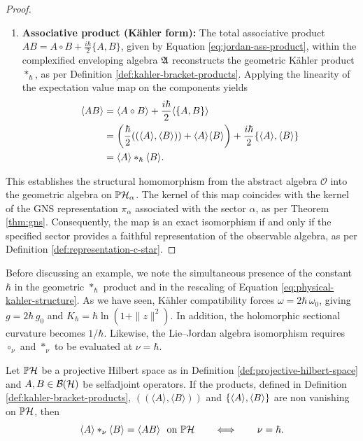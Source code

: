 \begin{proof}
\begin{enumerate}
		\item \textbf{Associative product (Kähler form):}
		The total associative product $AB = A \circ B + \frac{i\hbar}{2}\{A,B\}$, given by Equation \eqref{eq:jordan-ass-product}, within the complexified enveloping algebra $\mathfrak{A}$ reconstructs the geometric Kähler product $*_{\hbar}$, as per Definition \ref{def:kahler-bracket-products}. Applying the linearity of the expectation value map on the components yields
		\begin{align}
			\langle AB \rangle &= \langle A \circ B \rangle + \frac{i\hbar}{2}\langle \{A,B\} \rangle \nonumber \\
			&= \left( \frac{\hbar}{2}((\langle A \rangle, \langle B \rangle)) + \langle A \rangle \langle B \rangle \right) + \frac{i\hbar}{2}\{\langle A\rangle,\langle B\rangle\} \nonumber \\
			&= \langle A \rangle *_{\hbar} \langle B \rangle.
		\end{align} 
	\end{enumerate}
	This establishes the structural homomorphism from the abstract algebra $\mathcal{O}$ into the geometric algebra on $\PH_\alpha$. The kernel of this map coincides with the kernel of the GNS representation $\pi_\alpha$ associated with the sector $\alpha$, as per Theorem \ref{thm:gns}. Consequently, the map is an exact isomorphism if and only if the specified sector provides a faithful representation of the observable algebra, as per Definition \ref{def:representation-c-star}. 
\end{proof}

Before discussing an example, we note the simultaneous presence of the constant $\hbar$ in the geometric $*_{\hbar}$ product and in the rescaling of Equation \eqref{eq:physical-kahler-structure}. As we have seen, Kähler compatibility forces \(\omega = 2\hbar\,\omega_0\), giving \(g = 2\hbar\,g_0\) and \(K_{\hbar}=\hbar \ln(1+\|z\|^2)\). In addition, the holomorphic sectional curvature becomes \(1/\hbar\). Likewise, the Lie--Jordan algebra isomorphism requires \(\circ_{\nu}\) and \(*_{\nu}\) to be evaluated at \(\nu=\hbar\).

\begin{corollary}[Imposition of $\nu = \hbar$]
	\label{cor:hbar-structural-necessity}
	Let $\PH$ be a projective Hilbert space as in Definition \ref{def:projective-hilbert-space} and $A,B\in\BH$ be selfadjoint operators. If the products, defined in Definition \ref{def:kahler-bracket-products}, $((\langle A\rangle ,\langle B\rangle ))$ and
	$\{\langle A\rangle ,\langle B\rangle \}$ are non vanishing on $\PH$, then
	\begin{equation}
		\langle A\rangle *_{\nu} \langle B\rangle = \langle AB\rangle \ \text{ on } \PH
		\qquad\Longleftrightarrow\qquad \nu=\hbar.
	\end{equation}
\end{corollary}

